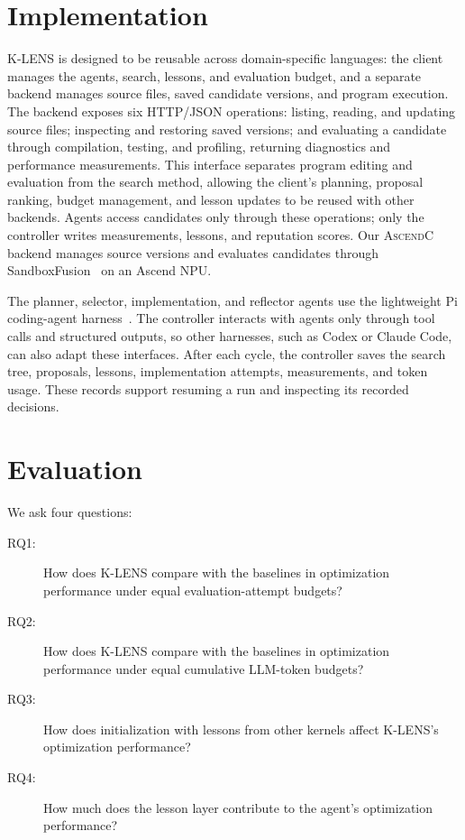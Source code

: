 \documentclass[acmsmall,screen,review,anonymous,nonacm]{acmart}
\newcommand{\klens}{\textsc{K-LENS}\xspace}
\newcommand{\ascendc}{\textsc{AscendC}\xspace}
\begin{document}
\section{Implementation}
\label{sec:implementation}

\klens is designed to be reusable across domain-specific languages: the client
manages the agents, search, lessons, and evaluation budget, and a separate backend
manages source files, saved candidate versions, and program execution. The backend
exposes six HTTP/JSON operations: listing, reading, and updating source files;
inspecting and restoring saved versions; and evaluating a candidate through
compilation, testing, and profiling, returning diagnostics and performance
measurements.
This interface separates program editing and evaluation from the search
method, allowing the client's planning, proposal ranking, budget management, and
lesson updates to be reused with other backends. Agents access candidates only
through these operations; only the controller writes measurements, lessons, and
reputation scores. Our \ascendc backend manages source versions and evaluates
candidates through SandboxFusion~\citep{Liu2024FullStackBench} on an Ascend NPU.

The planner, selector, implementation, and reflector agents use the
lightweight Pi coding-agent harness~\citep{Earendil2026Pi}. The controller
interacts with agents only through tool calls and structured outputs, so other
harnesses, such as Codex or Claude Code, can also adapt these
interfaces.
After each cycle, the controller saves the search tree, proposals, lessons,
implementation attempts, measurements, and token usage. These records support
resuming a run and inspecting its recorded decisions.

\section{Evaluation}
\label{sec:evaluation}

We ask four questions:

\begin{description}
  \item[RQ1:] How does \klens compare with the baselines in optimization
  performance under equal evaluation-attempt budgets?
  \item[RQ2:] How does \klens compare with the baselines in optimization
  performance under equal cumulative LLM-token budgets?
  \item[RQ3:] How does initialization with lessons from other kernels affect
  \klens's optimization performance?
  \item[RQ4:] How much does the lesson layer contribute to the agent’s optimization performance?
\end{description}
\end{document}
